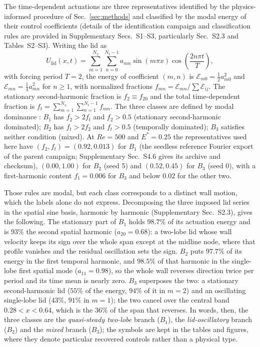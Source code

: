 \documentclass[11pt,a4paper]{article}
\newenvironment{chgadd}{\par\color{blue}}{\par\color{black}}
\begin{document}
\begin{chgadd}
The time-dependent actuations are three representatives identified by the
physics-informed procedure of Sec.~\ref{sec:methods} and classified by the modal
energy of their control coefficients (details of the identification campaign and
classification rules are provided in Supplementary Secs.~S1--S3, particularly
Sec.~S2.3 and Tables~S2--S3). Writing the lid as
\begin{equation}
U_{\mathrm{lid}}(x,t)=\sum_{m=1}^{N_x}\sum_{n=0}^{N_t-1}
a_{mn}\sin(m\pi x)\cos\!\left(\frac{2n\pi t}{T}\right),
\label{eq:fourier}
\end{equation}
with forcing period \(T=2\),
the energy of coefficient $(m,n)$ is $\mathcal{E}_{m0}=\tfrac12a_{m0}^2$ and
$\mathcal{E}_{mn}=\tfrac14a_{mn}^2$ for $n\ge1$, with normalized fractions
$f_{mn}=\mathcal{E}_{mn}/\sum\mathcal{E}_{ij}$. The stationary second-harmonic
fraction is $f_2\equiv f_{20}$ and the total time-dependent fraction is
$f_t=\sum_{m=1}^{N_x}\sum_{n=1}^{N_t-1}f_{mn}$. The three classes are defined by modal dominance
\cite{beniaiche2026}: $B_1$ has $f_2>2f_t$ and $f_2>0.5$ (stationary
second-harmonic dominated); $B_2$ has $f_t>2f_2$ and $f_t>0.5$ (temporally
dominated); $B_3$ satisfies neither condition (mixed). At $Re=500$ and
$E^\ast=0.25$ the representatives used here have
$(f_2,f_t)=(0.92,0.013)$ for $B_1$ (the seedless reference Fourier export of the
parent campaign; Supplementary Sec.~S4.6 gives its archive and checksum), $(0.00,1.00)$ for $B_2$ (seed 5) and
$(0.52,0.45)$ for $B_3$ (seed 0), with a first-harmonic content
$f_1=0.006$ for $B_3$ and below $0.02$ for the other two.

Those rules are modal, but each class corresponds to a distinct wall motion, which
the labels alone do not express. Decomposing the three
imposed lid series in the spatial sine basis, harmonic by harmonic
(Supplementary Sec.~S2.3), gives the following. The stationary part of $B_1$ holds
$98.7\%$ of its actuation energy and is $93\%$ the second spatial harmonic
($a_{20}=0.68$): a two-lobe lid whose wall velocity keeps its sign over the whole
span except at the midline node, where that profile vanishes and the residual
oscillation sets the sign. $B_2$ puts $97.7\%$ of its energy in the first temporal
harmonic, and
$98.5\%$ of that harmonic in the single-lobe first spatial mode ($a_{11}=0.98$), so
the whole wall reverses direction twice per period and its time mean is nearly
zero. $B_3$ superposes the two: a stationary second-harmonic lid ($55\%$ of the
energy, $94\%$ of it in $m=2$) and an oscillating single-lobe lid ($43\%$, $91\%$
in $m=1$); the two cancel over the central band $0.28<x<0.64$, which is the $36\%$
of the span that reverses. In words, then, the three
classes are the \emph{quasi-steady two-lobe} branch ($B_1$), the
\emph{lid-oscillatory} branch ($B_2$) and the \emph{mixed} branch ($B_3$); the
symbols are kept in the tables and figures, where they denote particular recovered
controls rather than a physical type.
\end{chgadd}
\end{document}
